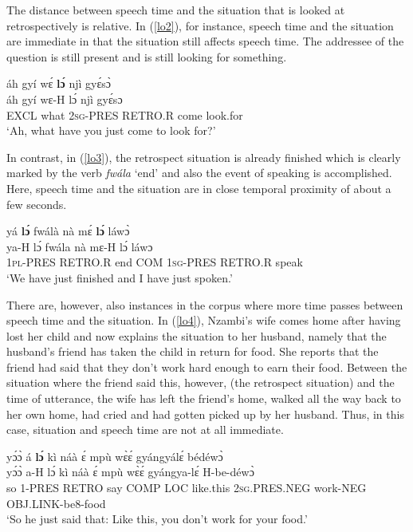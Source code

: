 The distance between speech time and the situation that is looked at retrospectively is relative. In (\ref{lo2}), for instance, speech time and the situation are immediate in that the situation still affects speech time. The addressee of the question is still present and is still looking for something.

\begin{exe}
\ex\label{lo2}
  \glll  áh gyí wɛ́ {\bfseries lɔ́} njì gyɛ́sɔ̀ \\
          áh gyí wɛ-H lɔ́ njì gyɛ́sɔ \\
           EXCL what 2\textsc{sg}-PRES RETRO.R come look.for   \\
    \trans `Ah, what have you just come to look for?'
\end{exe} 

\noindent In contrast, in (\ref{lo3}), the retrospect situation is already finished which is clearly marked by the verb {\itshape fwála} `end' and also the event of speaking is accomplished. Here, speech time and the situation are in close temporal proximity of about a few seconds.

\begin{exe}
\ex\label{lo3}
  \glll     yá {\bfseries lɔ́} fwálà nà mɛ́ {\bfseries lɔ́} láwɔ̀ \\
            ya-H lɔ́ fwála nà mɛ-H lɔ́ láwɔ \\
              1\textsc{pl}-PRES RETRO.R end COM 1\textsc{sg}-PRES RETRO.R speak \\
    \trans `We have just finished and I have just spoken.'
\end{exe}

\noindent There are, however, also instances in the corpus where more time passes between speech time and the situation. In (\ref{lo4}), Nzambi's wife comes home after having lost her child and now explains the situation to her husband, namely that the husband's friend has taken the child in return for food. She reports that the friend had said that they don't work hard enough to earn their food. Between the situation where the friend said this, however, (the retrospect situation) and the time of utterance, the wife has left the friend's home, walked all the way back to her own home, had cried and had gotten picked up by her husband. Thus, in this case, situation and speech time are not at all immediate.

\begin{exe} 
\ex\label{lo4}
  \glll yɔ́ɔ̀ á {\bfseries lɔ́} kì náà ɛ́ mpù wɛ̀ɛ́ gyángyálɛ́ bédéwɔ̀  \\
        yɔ́ɔ̀ a-H lɔ́ kì náà ɛ́ mpù wɛ̀ɛ́ gyángya-lɛ́ H-be-déwɔ̀  \\
        so 1-PRES RETRO say COMP LOC like.this 2\textsc{sg}.PRES.NEG work-NEG OBJ.LINK-be8-food \\
    \trans `So he just said that: Like this, you don't work for your food.'
\end{exe}


